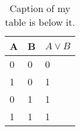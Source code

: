 \begin{table}[htbp]
\centering
\begin{tabular}{|l|l|l|}
\hline
\rowcolor[HTML]{67FD9A} 
A & B & $A \vee B$ \\ \hline
0 & 0 & 0          \\ \hline
1 & 0 & 1          \\ \hline
0 & 1 & 1          \\ \hline
1 & 1 & 1          \\ \hline
\end{tabular}
\label{tab:OR}
\caption{Caption of my table is below it.}
\end{table}
